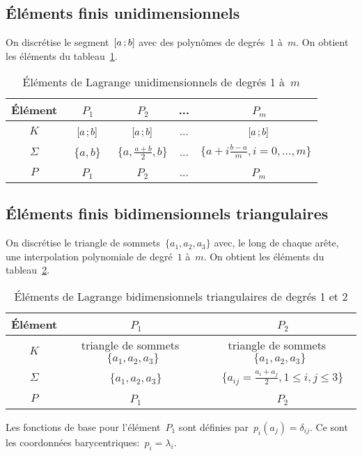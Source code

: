 \medskip
\subsection*{Éléments finis unidimensionnels}
On discrétise le segment~$\mathopen{[}a\,;b\mathclose{]}$ avec des polynômes de degrés~$1$ à~$m$.
On obtient les éléments du tableau~\ref{tab:Elem:uni}.
\begin{table}[ht]\centering\small
\begin{tabular}{c|cccc}
Élément &~$P_1$ &~$P_2$ & ... &~$P_m$\\
\hline
$K$	  &~$\mathopen{[}a\,;b\mathclose{]}$ &~$\mathopen{[}a\,;b\mathclose{]}$ & ... &~$\mathopen{[}a\,;b\mathclose{]}$\\
$\Sigma$ &~$\{a,b\}$ &~$\{a,\frac{a+b}2, b\}$& ... &$\{a+i\frac{b-a}m, i=0,\ldots, m\}$\\
$P$   &~$P_1$ &~$P_2$ & ... &~$P_m$\\
\hline
\end{tabular}
\caption{Éléments de Lagrange unidimensionnels de degrés 1 à~$m$}\label{tab:Elem:uni}
\end{table}

\medskip
\subsection*{Éléments finis bidimensionnels triangulaires}
On discrétise le triangle de sommets~$\{a_1, a_2, a_3\}$ avec, le long de chaque arête, une interpolation polynomiale de degré~$1$ à~$m$.
On obtient les éléments du tableau~\ref{tab:Elem:bi}.
\begin{table}[h!]\centering\small
\begin{tabular}{c|cc}
Élément &~$P_1$ &~$P_2$ \\
\hline
$K$	  & triangle de sommets~$\{a_1, a_2, a_3\}$ & triangle de sommets~$\{a_1, a_2, a_3\}$\\
$\Sigma$ &~$\{a_1, a_2, a_3\}$ &~$\{a_{ij}=\frac{a_i+a_j}2, 1\le i,j\le 3\}$ \\
$P$   &~$P_1$ &~$P_2$ \\
\hline
\end{tabular}
\caption{Éléments de Lagrange bidimensionnels triangulaires de degrés 1 et 2}\label{tab:Elem:bi}
\end{table}

\begin{remarque}Les fonctions de base pour l'élément~$P_1$ sont définies par~$p_i(a_j) = \delta_{ij}$. Ce sont les coordonnées barycentriques:~$p_i = \lambda_i$.\end{remarque}

